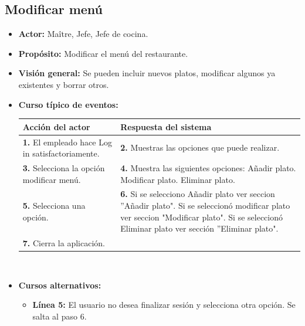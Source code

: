 \documentclass[spanish,a4paper,12pt]{report}	%
\begin{document}

		\subsection{Modificar menú}
			\begin{itemize}
			\item \textbf{Actor:} Maître, Jefe, Jefe de cocina.
			\item \textbf{Propósito: } Modificar el menú del restaurante.
			\item \textbf{Visión general:} Se pueden incluir nuevos platos, modificar algunos ya existentes y borrar otros.
	\newpage
			\item \textbf{Curso típico de eventos:} 	\\
				\begin{tabular}{|p{6cm}||p{6cm}|}
				\hline
				\textbf{Acción del actor} & \textbf{Respuesta del sistema} \\ \hline \hline
				\textbf{1.}    El empleado hace Log in satisfactoriamente. & \textbf{2.} Muestras las opciones que puede realizar. \\ \hline
				\textbf{3.} Selecciona la opción modificar menú. & \textbf{4.} Muestra las siguientes opciones: Añadir plato. Modificar plato. Eliminar plato. \\ \hline
				\textbf{5.} Selecciona una opción.	& \textbf{6.} Si se selecciono Añadir plato ver seccion ''Añadir plato". Si se seleccionó modificar plato ver seccion "Modificar plato". Si se seleccionó Eliminar plato ver sección ''Eliminar plato". \\ \hline
				\textbf{7.} Cierra la aplicación. &  \\ \hline
			\end{tabular}
			\\
			\item \textbf{Cursos alternativos:} 
			\begin{itemize}
			\item  \textbf{Línea 5:} El usuario no desea finalizar sesión y selecciona otra opción. Se salta al paso 6.
			\end {itemize}
			

\end{itemize}
\end{document}
